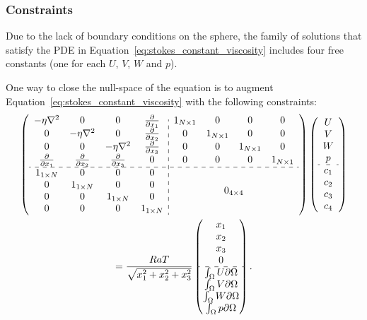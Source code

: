 \subsubsection{Constraints} 
Due to the lack of boundary conditions on the sphere, the family of solutions that satisfy the PDE in Equation~\ref{eq:stokes_constant_viscosity} includes four free constants (one for each $U$, $V$, $W$ and $p$). 

One way to close the null-space of the equation is to augment Equation~\ref{eq:stokes_constant_viscosity} with the following constraints: 
\begin{multline}
\left(\begin{array}{cccc:cccc}  
-\eta \Laplacian & 0 & 0 & \pd{}{x_1} & 1_{N \times 1} & 0 & 0 & 0 \\ 
0 & -\eta \Laplacian & 0 & \pd{}{x_2} & 0 & 1_{N \times 1} & 0 & 0\\ 
0 & 0 & -\eta \Laplacian & \pd{}{x_3} & 0 & 0 & 1_{N \times 1} & 0\\ 
\pd{}{x_1} & \pd{}{x_2} & \pd{}{x_3} & 0 & 0 & 0 & 0 & 1_{N \times 1}\\
\hdashline
1_{1 \times N} & 0 & 0 & 0 & \multicolumn{4}{c}{\multirow{4}{*}{$0_{4 \times 4}$}} \\
0 & 1_{1 \times N} & 0 & 0 & \\
0 & 0 & 1_{1 \times N} & 0 & \\ 
0 & 0 & 0 & 1_{1 \times N} & \\
\end{array} \right) \left(\begin{array}{c} 
U \\ V \\ W \\ p \\ \hdashline c_1 \\ c_2 \\ c_3 \\ c_4
\end{array} \right) \\
 = \frac{RaT}{\sqrt{x_1^2 + x_2^2 + x_3^2}}\begin{pmatrix} x_1 \\ x_2 \\ x_3 \\ 0 \\ \hdashline \int_\Omega U \partial\Omega \\ \int_\Omega V \partial\Omega \\ \int_\Omega W \partial\Omega \\ \int_\Omega p \partial\Omega \end{pmatrix}.
\label{eq:stokes_system_with_constraints}
\end{multline}
